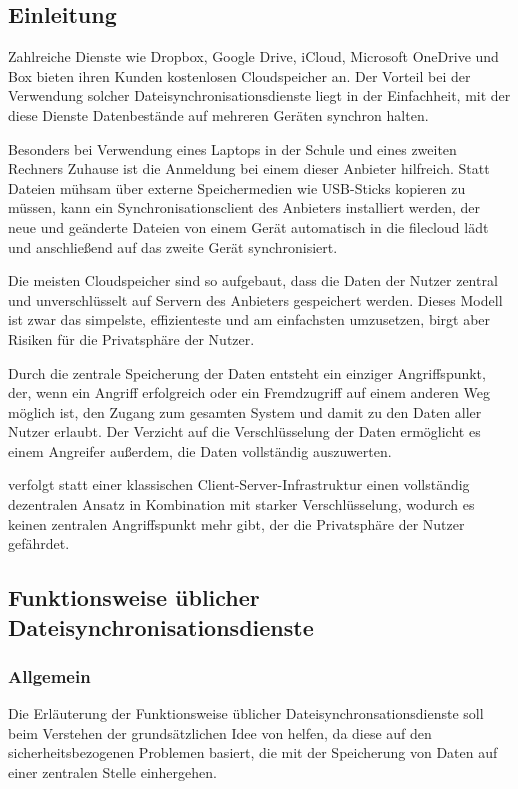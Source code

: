 \subsection{Einleitung}
Zahlreiche Dienste wie Dropbox, Google Drive, iCloud, Microsoft OneDrive und Box
bieten ihren Kunden kostenlosen Cloudspeicher an.
Der Vorteil bei der Verwendung solcher Dateisynchronisationsdienste liegt in der
Einfachheit, mit der diese Dienste Datenbestände auf mehreren Geräten synchron
halten.

Besonders bei Verwendung eines Laptops in der Schule und eines zweiten Rechners
Zuhause ist die Anmeldung bei einem dieser Anbieter hilfreich.
Statt Dateien mühsam über externe Speichermedien wie USB-Sticks kopieren zu
müssen, kann ein Synchronisationsclient des Anbieters installiert werden, der
neue und geänderte Dateien von einem Gerät automatisch in die \gls{filecloud}
lädt und anschließend auf das zweite Gerät synchronisiert.

Die meisten Cloudspeicher sind so aufgebaut, dass die Daten der Nutzer zentral
und unverschlüsselt auf Servern des Anbieters gespeichert werden.
Dieses Modell ist zwar das simpelste, effizienteste und am einfachsten
umzusetzen, birgt aber Risiken für die Privatsphäre der Nutzer.

Durch die zentrale Speicherung der Daten entsteht ein einziger Angriffspunkt,
der, wenn ein Angriff erfolgreich oder ein Fremdzugriff auf einem anderen Weg
möglich ist, den Zugang zum gesamten System und damit zu den Daten aller Nutzer
erlaubt.
Der Verzicht auf die Verschlüsselung der Daten ermöglicht es einem Angreifer
außerdem, die Daten vollständig auszuwerten.

\sblitg verfolgt statt einer klassischen Client-Server-Infrastruktur einen
vollständig dezentralen Ansatz in Kombination mit starker Verschlüsselung,
wodurch es keinen zentralen Angriffspunkt mehr gibt, der die Privatsphäre der Nutzer gefährdet.

\subsection{Funktionsweise üblicher Dateisynchronisationsdienste}
\subsubsection{Allgemein}
Die Erläuterung der Funktionsweise üblicher Dateisynchronsationsdienste soll beim
Verstehen der grundsätzlichen Idee von \sblit helfen, da diese auf den
sicherheitsbezogenen Problemen basiert, die mit der Speicherung von Daten auf einer
zentralen Stelle einhergehen.

